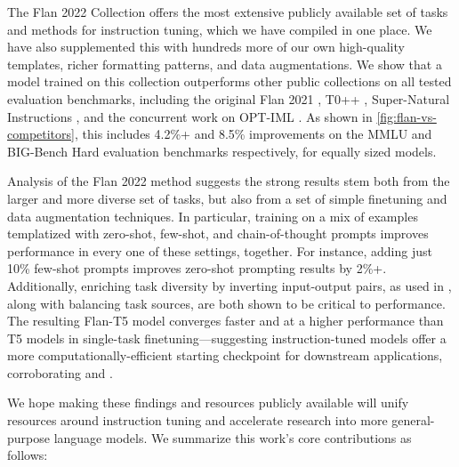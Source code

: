 The Flan 2022 Collection offers the most extensive publicly available set of tasks and methods for instruction tuning, which we have compiled in one place. We have also supplemented this with hundreds more of our own high-quality templates, richer formatting patterns, and data augmentations. We show that a model trained on this collection outperforms other public collections on all tested evaluation benchmarks, including the original Flan 2021 \citep{wei2021finetuned}, T0++ \citep{sanh2021multitask}, Super-Natural Instructions \citep{wang2022benchmarking}, and the concurrent work on OPT-IML \citep{iyer2022optiml}. As shown in \ref{fig:flan-vs-competitors}, this includes 4.2\%+ and 8.5\% improvements on the MMLU \citep{hendrycks2020measuring} and BIG-Bench Hard \citep{suzgun2022challenging} evaluation benchmarks respectively, for equally sized models.

Analysis of the Flan 2022 method suggests the strong results stem both from the larger and more diverse set of tasks, but also from a set of simple finetuning and data augmentation techniques. In particular, training on a mix of examples templatized with zero-shot, few-shot, and chain-of-thought prompts improves performance in every one of these settings, together. For instance, adding just 10\% few-shot prompts improves zero-shot prompting results by 2\%+.
Additionally, enriching task diversity by inverting input-output pairs, as used in \citep{sanh2021multitask,min-etal-2022-metaicl}, along with balancing task sources, are both shown to be critical to performance. The resulting Flan-T5 model converges faster and at a higher performance than T5 models in single-task finetuning---suggesting instruction-tuned models offer a more computationally-efficient starting checkpoint for downstream applications, corroborating \citet{aribandi2021ext5} and \citet{tfew2022}.

We hope making these findings and resources publicly available will unify resources around instruction tuning and accelerate research into more general-purpose language models. We summarize this work's core contributions as follows:

